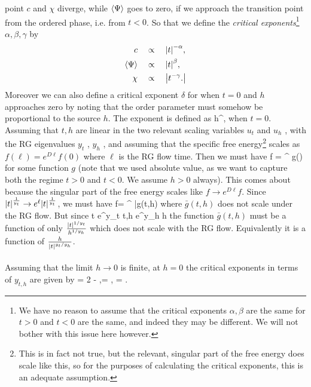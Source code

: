 point $c$ and $\chi$ diverge, while $\expval{\Psi}$ goes to zero, if we approach the transition point from the
ordered phase, i.e. from $t < 0$. So that we define the \emph{critical exponents}\footnote{We have no reason to assume that the critical exponents $α, β$ are the same for $t > 0$ and $t < 0$ are the
	same, and indeed they may be different. We will not bother with this issue here however.} $\alpha,\beta,\gamma$ by
\begin{align}
	c \quad &\propto \quad \abs{t}^{-\alpha}, \\
	\expval{\Psi}\quad  &\propto \quad \abs{t}^\beta, \\
	\chi \quad &\propto \quad \abs{t^{-\gamma}.}
\end{align}
Moreover we can also define a critical exponent $\delta$ for when $t = 0$ and $h$ approaches zero
by noting that the order parameter must somehow be proportional to the source $h$. The
exponent is defined as 
\be 
\expval{\Psi} \quad \propto \quad h^{},
\ee 
when $t=0$.
\\
Assuming that $t, h$ are linear in the two relevant scaling variables $u_t$ and $u_h$ , with the
RG eigenvalues $y_t$ , $y_h$ , and assuming that the specific free energy\footnote{This is in fact not true, but the relevant, singular part of the free energy does scale like this, so for the
	purposes of calculating the critical exponents, this is an adequate assumption.} scales as $f(\ell) = e^{D \ell } f(0)$ where $\ell$ is the RG flow time. Then we must have
\bse 
f = ^{} g\left(\right)
\ese  
for some function $g$ (note that we used absolute value, as we want to capture both
the regime $t > 0$ and $t < 0$. We assume $h > 0$ always). This comes about because the singular part of the free energy scales like $f \rightarrow e^{D \ell} f$. Since $\abs{t}^{\frac{1}{y_t}} \rightarrow e^\ell \abs{t}^{\frac{1}{y_t}}$, we must have 
		\bse 
		f= ^{} \bar{g}(t,h)
		\ese 
		where $\bar{g}(t,h)$ does not scale under the RG flow. But since
		\bse 
		t \rightarrow e^{\ell y_t} t,\quad h \rightarrow e^{\ell y_h} h
		\ese 
the function $\bar{g}(t,h)$ must be a function of only $\frac{\abs{t}^{1/y_t}}{h^{1/y_h}}$ which does not scale with the RG flow. Equivalently it is a function of $\frac{h}{\abs{t}^{y_t/y_h}}$.\\
\\
Assuming that the limit $h\rightarrow0$ is finite,  at $h=0$ the critical exponents in terms of $y_{t,h}$ are given by
\be 
\alpha= 2 - ,\quad \beta = , \quad \gamma = .
